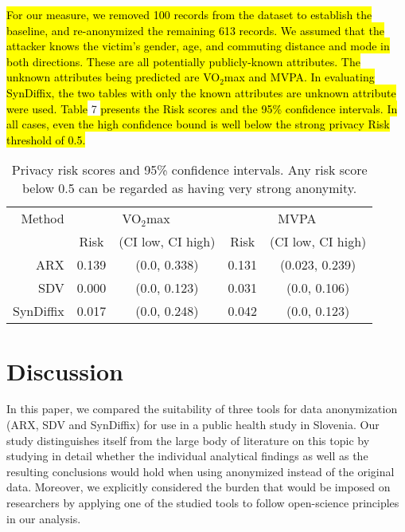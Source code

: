 \documentclass[10pt]{article}
\begin{document}
\hl{For our measure, we removed 100 records from the dataset to establish the baseline, and re-anonymized the remaining 613 records. We assumed that the attacker knows the victim's gender, age, and commuting distance and mode in both directions. These are all potentially publicly-known attributes. The unknown attributes being predicted are VO$_2$max and MVPA. In evaluating SynDiffix, the two tables with only the known attributes are unknown attribute were used. Table} 7 \hl{presents the Risk scores and the 95\% confidence intervals. In all cases, even the high confidence bound is well below the strong privacy Risk threshold of 0.5.}


\begin{table}
\begin{center}
\begin{small}
\begin{tabular}{rcccc}
\toprule
Method & \multicolumn{2}{c}{VO$_2$max} & \multicolumn{2}{c}{MVPA} \\ 
 & Risk & (CI low, CI high) & Risk & (CI low, CI high) \\ 
\midrule
ARX & 0.139 & (0.0, 0.338) & 0.131 & (0.023, 0.239) \\ 
SDV & 0.000 & (0.0, 0.123) & 0.031 & (0.0, 0.106) \\ 
SynDiffix & 0.017 & (0.0, 0.248) & 0.042 & (0.0, 0.123) \\ 
\bottomrule
\end{tabular}
\end{small}
\caption{Privacy risk scores and 95\% confidence intervals. Any risk score below 0.5 can be regarded as having very strong anonymity.}
\label{tab:risk_eval}
\end{center}
\end{table}


\section*{Discussion}

In this paper, we compared the suitability of three tools for data anonymization (ARX, SDV and SynDiffix) for use in a public health study in Slovenia. Our study distinguishes itself from the large body of literature on this topic by studying in detail whether the individual analytical findings as well as the resulting conclusions would hold when using anonymized instead of the original data. Moreover, we explicitly considered the burden that would be imposed on researchers by applying one of the studied tools to follow open-science principles in our analysis.
\end{document}
